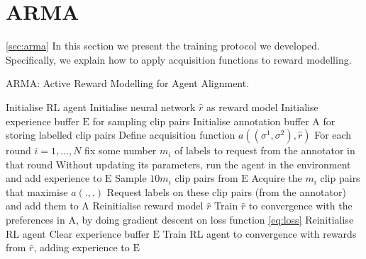 \documentclass[11pt, a4paper, bibliography=totoc]{report}
\newcommand{\rp}{\hat{r}}
\newcommand{\expbuff}{\mathrm{E}}
\newcommand{\annbuff}{\mathrm{A}}
\begin{document}
\section{ARMA} \ref{sec:arma}
In this section we present the training protocol we developed. Specifically, we explain how to apply acquisition functions to reward modelling. %
\begin{algorithm}
	\caption{ARMA: Active Reward Modelling for Agent Alignment.}
	\label{alg:arma}
	\begin{algorithmic}[1]
        \State Initialise RL agent
		\State Initialise neural network $ \rp $ as reward model
		\State Initialise experience buffer $ \expbuff $ for sampling clip pairs
		\State Initialise annotation buffer $ \annbuff $ for storing labelled clip pairs
		\State Define acquisition function $ a((\sigma^1, \sigma^2), \rp) $
		\State For each round $ i=1, \dots, N $ fix some number $ m_i $ of labels to request from the annotator in that round
		\State Without updating its parameters, run the agent in the environment and add experience to $ \expbuff $
		\State Sample $ 10m_i $ clip pairs from $ \expbuff $ \label{line:sample_exp}
		\State Acquire the $ m_i $ clip pairs that maximise $ a(.,.) $ \label{line:acquire}
		\State Request labels on these clip pairs (from the annotator) and add them to $ \annbuff $
		\State Reinitialise reward model $ \rp $ \label{line:train_r}
		\State Train $ \rp $ to convergence with the preferences in $ \annbuff $, by doing gradient descent on loss function \ref{eq:loss}
		\State Reinitialise RL agent
		\State Clear experience buffer $ \expbuff $
		\State Train RL agent to convergence with rewards from $ \rp $, adding experience to $ \expbuff $ \label{line:call_dqn}
		\EndFor
	\end{algorithmic}
\end{algorithm}
\end{document}
